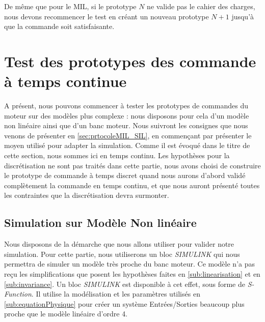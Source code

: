	De même que pour le MIL, si le prototype $N$ ne valide pas le cahier des charges, nous devons recommencer le test en créant un nouveau prototype $N+1$ jusqu'à que la commande soit satisfaisante. 
\section{Test des prototypes des commande à temps continue}
	A présent, nous pouvons commencer à tester les prototypes de commandes du moteur sur des modèles plus complexe : nous disposons pour cela d'un modèle non linéaire ainsi que d'un banc moteur. Nous suivront les consignes que nous venons de présenter en \ref{sec:prtocoleMIL_SIL}, en commençant par présenter le moyen utilisé pour adapter la simulation. 
	Comme il est évoqué dans le titre de cette section, nous sommes ici en temps continu. Les hypothèses pour la discrétisation ne sont pas traités dans cette partie, nous avons choisi de construire le prototype de commande à temps discret quand nous aurons d'abord validé complètement la commande en temps continu, et que nous auront présenté toutes les contraintes que la discrétisation devra surmonter. %
	\subsection{Simulation sur Modèle Non linéaire}
		
		Nous disposons de la démarche que nous allons utiliser pour valider notre simulation. Pour cette partie, nous utiliserons un bloc \emph{SIMULINK} qui nous permettra de simuler un modèle très proche du banc moteur. Ce modèle n'a pas reçu les simplifications que posent les hypothèses faites en \ref{sub:linearisation} et en \ref{sub:invariance}. Un bloc \emph{SIMULINK} est disponible à cet effet, sous forme de \emph{S-Function}. Il utilise la modélisation et les paramètres utilisés en \ref{sub:equationPhysique} pour créer un système Entrées/Sorties beaucoup plus proche que le modèle linéaire d'ordre 4. 
